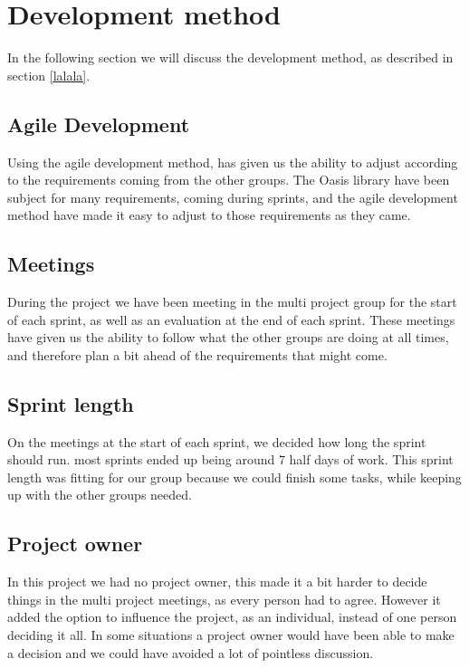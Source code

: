 \section{Development method}
In the following section we will discuss the development method, as described in section \vref{lalala}.

\subsection{Agile Development}
Using the agile development method, has given us the ability to adjust according to the requirements coming from the other groups. The Oasis library have been subject for many requirements, coming during sprints, and the agile development method have made it easy to adjust to those requirements as they came.

\subsection{Meetings}
During the project we have been meeting in the multi project group for the start of each sprint, as well as an evaluation at the end of each sprint. These meetings have given us the ability to follow what the other groups are doing at all times, and therefore plan a bit ahead of the requirements that might come.

\subsection{Sprint length}
On the meetings at the start of each sprint, we decided how long the sprint should run. most sprints ended up being around 7 half days of work. This sprint length was fitting for our group because we could finish some tasks, while keeping up with the other groups needed.

\subsection{Project owner}
In this project we had no project owner, this made it a bit harder to decide things in the multi project meetings, as every person had to agree. However it added the option to influence the project, as an individual, instead of one person deciding it all. In some situations a project owner would have been able to make a decision and we could have avoided a lot of pointless discussion.